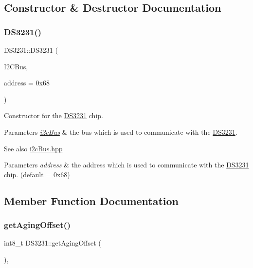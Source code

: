 \subsection{Constructor \& Destructor Documentation}
\mbox{\label{class_d_s3231_ac1f8a5e8553eebfb90dbb432f00812a3}} 
\subsubsection{\texorpdfstring{D\+S3231()}{DS3231()}}
{\footnotesize\ttfamily D\+S3231\+::\+D\+S3231 (\begin{DoxyParamCaption}\item[{\mbox{\hyperlink{classi2c_bus}{i2c\+Bus}} \&}]{I2\+C\+Bus,  }\item[{uint8\+\_\+t}]{address = {\ttfamily 0x68} }\end{DoxyParamCaption})}



Constructor for the \mbox{\hyperlink{class_d_s3231}{D\+S3231}} chip. 


\begin{DoxyParams}{Parameters}
{\em \mbox{\hyperlink{classi2c_bus}{i2c\+Bus}}} & the bus which is used to communicate with the \mbox{\hyperlink{class_d_s3231}{D\+S3231}}. \\
\hline
\end{DoxyParams}
\begin{DoxySeeAlso}{See also}
\mbox{\hyperlink{i2c_bus_8hpp_source}{i2c\+Bus.\+hpp}} 
\end{DoxySeeAlso}

\begin{DoxyParams}{Parameters}
{\em address} & the address which is used to communicate with the \mbox{\hyperlink{class_d_s3231}{D\+S3231}} chip. (default = 0x68) \\
\hline
\end{DoxyParams}


\subsection{Member Function Documentation}
\mbox{\label{class_d_s3231_a94e9f40f1b453dc4d8894b63bc0ec7d6}} 
\subsubsection{\texorpdfstring{get\+Aging\+Offset()}{getAgingOffset()}}
{\footnotesize\ttfamily int8\+\_\+t D\+S3231\+::get\+Aging\+Offset (\begin{DoxyParamCaption}{ }\end{DoxyParamCaption})\hspace{0.3cm}{\ttfamily [override]}, {\ttfamily [virtual]}}



